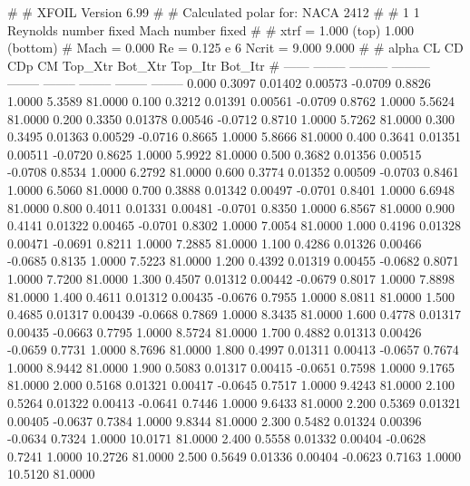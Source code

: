 #  
#       XFOIL         Version 6.99
#  
# Calculated polar for: NACA 2412                                       
#  
# 1 1 Reynolds number fixed          Mach number fixed         
#  
# xtrf =   1.000 (top)        1.000 (bottom)  
# Mach =   0.000     Re =     0.125 e 6     Ncrit =   9.000  9.000
#  
#   alpha    CL        CD       CDp       CM     Top_Xtr  Bot_Xtr  Top_Itr  Bot_Itr
#  ------ -------- --------- --------- -------- -------- -------- -------- --------
   0.000   0.3097   0.01402   0.00573  -0.0709   0.8826   1.0000   5.3589  81.0000
   0.100   0.3212   0.01391   0.00561  -0.0709   0.8762   1.0000   5.5624  81.0000
   0.200   0.3350   0.01378   0.00546  -0.0712   0.8710   1.0000   5.7262  81.0000
   0.300   0.3495   0.01363   0.00529  -0.0716   0.8665   1.0000   5.8666  81.0000
   0.400   0.3641   0.01351   0.00511  -0.0720   0.8625   1.0000   5.9922  81.0000
   0.500   0.3682   0.01356   0.00515  -0.0708   0.8534   1.0000   6.2792  81.0000
   0.600   0.3774   0.01352   0.00509  -0.0703   0.8461   1.0000   6.5060  81.0000
   0.700   0.3888   0.01342   0.00497  -0.0701   0.8401   1.0000   6.6948  81.0000
   0.800   0.4011   0.01331   0.00481  -0.0701   0.8350   1.0000   6.8567  81.0000
   0.900   0.4141   0.01322   0.00465  -0.0701   0.8302   1.0000   7.0054  81.0000
   1.000   0.4196   0.01328   0.00471  -0.0691   0.8211   1.0000   7.2885  81.0000
   1.100   0.4286   0.01326   0.00466  -0.0685   0.8135   1.0000   7.5223  81.0000
   1.200   0.4392   0.01319   0.00455  -0.0682   0.8071   1.0000   7.7200  81.0000
   1.300   0.4507   0.01312   0.00442  -0.0679   0.8017   1.0000   7.8898  81.0000
   1.400   0.4611   0.01312   0.00435  -0.0676   0.7955   1.0000   8.0811  81.0000
   1.500   0.4685   0.01317   0.00439  -0.0668   0.7869   1.0000   8.3435  81.0000
   1.600   0.4778   0.01317   0.00435  -0.0663   0.7795   1.0000   8.5724  81.0000
   1.700   0.4882   0.01313   0.00426  -0.0659   0.7731   1.0000   8.7696  81.0000
   1.800   0.4997   0.01311   0.00413  -0.0657   0.7674   1.0000   8.9442  81.0000
   1.900   0.5083   0.01317   0.00415  -0.0651   0.7598   1.0000   9.1765  81.0000
   2.000   0.5168   0.01321   0.00417  -0.0645   0.7517   1.0000   9.4243  81.0000
   2.100   0.5264   0.01322   0.00413  -0.0641   0.7446   1.0000   9.6433  81.0000
   2.200   0.5369   0.01321   0.00405  -0.0637   0.7384   1.0000   9.8344  81.0000
   2.300   0.5482   0.01324   0.00396  -0.0634   0.7324   1.0000  10.0171  81.0000
   2.400   0.5558   0.01332   0.00404  -0.0628   0.7241   1.0000  10.2726  81.0000
   2.500   0.5649   0.01336   0.00404  -0.0623   0.7163   1.0000  10.5120  81.0000
